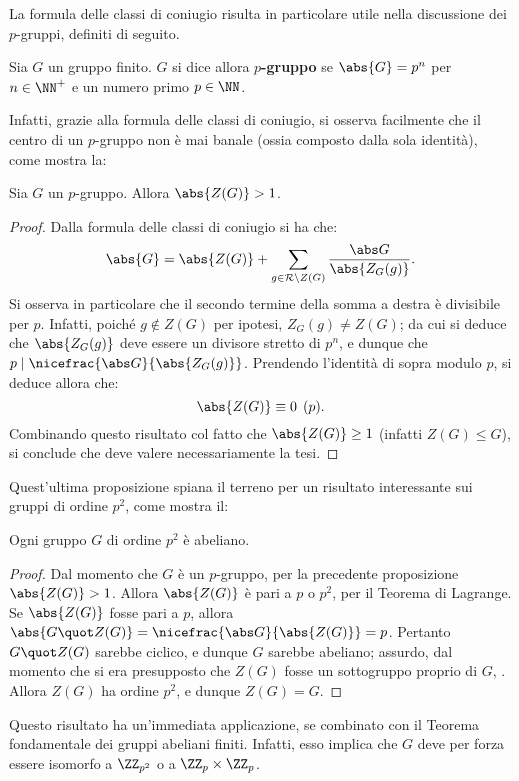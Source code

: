 \documentclass[12pt]{scrartcl}
\begin{document}
	
	La formula delle classi di coniugio risulta in particolare utile nella discussione
	dei $p$-gruppi, definiti di seguito.
	
	\begin{definition}[$p$-gruppo]
		Sia $G$ un gruppo finito. $G$ si dice allora \textbf{$p$-gruppo} se
		$\abs{G} = p^n$ per $n \in \NN^+$ e un numero primo $p \in \NN$.
	\end{definition}
	
	Infatti, grazie alla formula delle classi di coniugio, si osserva facilmente che il centro di un $p$-gruppo non è mai banale (ossia composto dalla sola identità), come mostra la:
	
	\begin{proposition}
		Sia $G$ un $p$-gruppo. Allora $\abs{Z(G)} > 1$. 
	\end{proposition}
	
	\begin{proof}
		Dalla formula delle classi di coniugio si ha che:
		\[ \abs{G} = \abs{Z(G)} + \sum_{g \in \mathcal{R} \setminus Z(G)} \frac{\abs G}{\abs{Z_G(g)}}. \]
		Si osserva in particolare che il secondo termine della somma a destra è divisibile
		per $p$. Infatti, poiché $g \notin Z(G)$ per ipotesi, $Z_G(g) \neq Z(G)$; da cui
		si deduce che $\abs{Z_G(g)}$ deve essere un divisore stretto di $p^n$, e dunque
		che $p \mid \nicefrac{\abs G}{\abs{Z_G(g)}}$. Prendendo l'identità di sopra modulo
		$p$, si deduce allora che:
		\[ \abs{Z(G)} \equiv 0 \pod p. \]
		Combinando questo risultato col fatto che $\abs{Z(G)} \geq 1$ (infatti $Z(G) \leq G$),
		si conclude che deve valere necessariamente la tesi.
	\end{proof} \medskip
	
	
	Quest'ultima proposizione spiana il terreno per un risultato interessante sui
	gruppi di ordine $p^2$, come mostra il:
	
	\begin{theorem}
		Ogni gruppo $G$ di ordine $p^2$ è abeliano.
	\end{theorem}
	
	\begin{proof}
		Dal momento che $G$ è un $p$-gruppo, per la precedente proposizione
		$\abs{Z(G)} > 1$. Allora $\abs{Z(G)}$ è pari a $p$ o $p^2$, per il
		Teorema di Lagrange. Se $\abs{Z(G)}$ fosse pari a $p$, allora
		$\abs{G \quot Z(G)} = \nicefrac{\abs G}{\abs{Z(G)}} = p$. Pertanto
		$G \quot Z(G)$ sarebbe ciclico, e dunque $G$ sarebbe abeliano; assurdo,
		dal momento che si era presupposto che $Z(G)$ fosse un sottogruppo proprio
		di $G$, \Lightning. Allora $Z(G)$ ha ordine $p^2$,
		e dunque $Z(G) = G$.
	\end{proof}
	
	Questo risultato ha un'immediata applicazione, se combinato con il Teorema
	fondamentale dei gruppi abeliani finiti. Infatti, esso implica che
	$G$ deve per forza essere isomorfo a $\ZZ_{p^2}$ o a $\ZZ_{p} \times \ZZ_{p}$.
\end{document}
